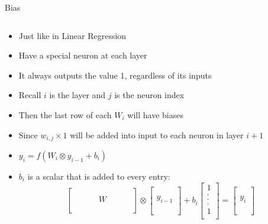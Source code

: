 \documentclass[aspectratio=169]{beamer}
\begin{document}
\begin{frame}{Bias}

\begin{columns}
\begin{column}{0.6\textwidth}
{\footnotesize{
\begin{itemize}
	\item Just like in Linear Regression
	\item Have a special neuron at each layer
	\item It always outputs the value 1, regardless of its inputs
	\item Recall $i$ is the layer and $j$ is the neuron index
	\item Then the last row of each $W_i$ will have biases
	\item Since $w_{i,j} \times 1$ will be added into input to each neuron in layer $i+1$
	\item $y_i = f(W_{i} \otimes y_{i-1} + b_i )$
	\item $b_i$ is a scalar that is added to every entry:
\[
\begin{bmatrix}
& & \\
 \hspace{2em} & W & \hspace{2em} \\
& & \\
\end{bmatrix}
\otimes
\begin{bmatrix}
 \\ \\
y_{i-1}  \\
 \\ \\
\end{bmatrix}
+ b_i 
\begin{bmatrix}
 1\\  .\\
.  \\
. \\ 1 \\
\end{bmatrix}
= 
\begin{bmatrix}
 \\ \\
y_{i}  \\
 \\ \\
\end{bmatrix}
\]


\end{itemize}}}
\end{column}
\end{columns}
\end{frame}
\end{document}

